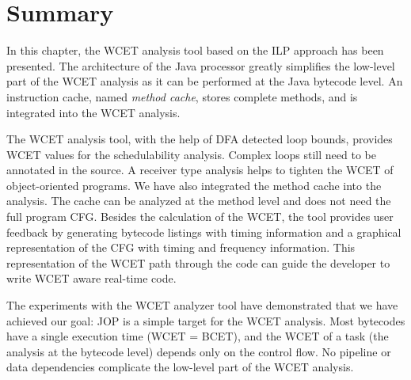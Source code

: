 %
%

%



\section{Summary}
\label{sec:wcet:summary}

In this chapter, the WCET analysis tool based on the ILP approach has
been presented. The architecture of the Java processor greatly
simplifies the low-level part of the WCET analysis as it can be
performed at the Java bytecode level. An instruction cache, named
\emph{method cache}, stores complete methods, and is integrated into
the WCET analysis.

The WCET analysis tool, with the help of DFA detected loop bounds,
provides WCET values for the schedulability analysis. Complex loops
still need to be annotated in the source. A receiver type analysis
helps to tighten the WCET of object-oriented programs. We have also
integrated the method cache into the analysis. The cache can be
analyzed at the method level and does not need the full program CFG.
Besides the calculation of the WCET, the tool provides user feedback
by generating bytecode listings with timing information and a
graphical representation of the CFG with timing and frequency
information. This representation of the WCET path through the code
can guide the developer to write WCET aware real-time code.

The experiments with the WCET analyzer tool have demonstrated that we
have achieved our goal: JOP is a simple target for the WCET analysis.
Most bytecodes have a single execution time (WCET = BCET), and the
WCET of a task (the analysis at the bytecode level) depends only on
the control flow. No pipeline or data dependencies complicate the
low-level part of the WCET analysis.

